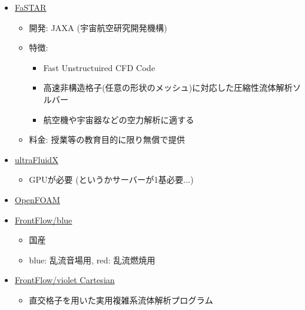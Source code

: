 \begin{itemize}
                \item \href{https://fastar.chofu.jaxa.jp/}{FaSTAR}
                    \begin{itemize}
                    \item 開発: JAXA (宇宙航空研究開発機構)
                    \item 特徴: 
                        \begin{itemize}
                        \item Fast Unstructuired CFD Code
                        \item 高速非構造格子(任意の形状のメッシュ)に対応した圧縮性流体解析ソルバー
                        \item 航空機や宇宙器などの空力解析に適する
                        \end{itemize}
                    \item 料金: 授業等の教育目的に限り無償で提供
                    \end{itemize}
                    
                \item \href{https://altairhyperworks.jp/product/ultrafluidx}{ultraFluidX}
                    \begin{itemize}
                    \item GPUが必要 (というかサーバーが1基必要...)
                    \end{itemize}
                
                \item \href{https://www.openfoam.com/}{OpenFOAM}
                
                \item \href{http://www.ciss.iis.u-tokyo.ac.jp/dl/}{FrontFlow/blue}
                    \begin{itemize}
                    \item 国産
                    \item blue: 乱流音場用,  red: 乱流燃焼用
                    \end{itemize}
                
                \item \href{http://www.cenav.org/kdb/?page_id=328}{FrontFlow/violet Cartesian}
                    \begin{itemize}
                    \item 直交格子を用いた実用複雑系流体解析プログラム
                    \end{itemize}
                

\end{itemize}
